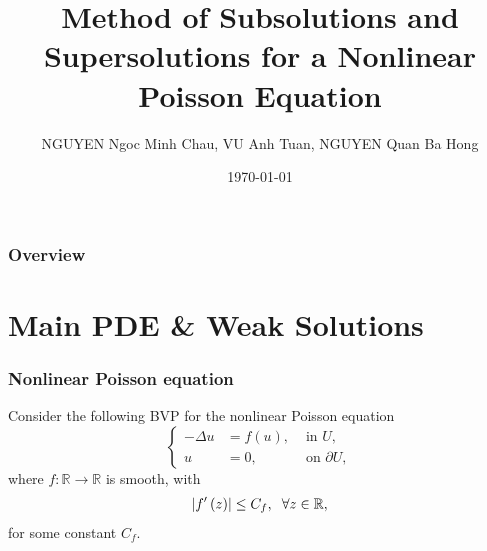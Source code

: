 \documentclass{beamer}
\title[Methods of Subsolutions and Supersolutions for a Nonlinear Poisson Equation]{Method of Subsolutions and Supersolutions for a Nonlinear Poisson Equation} %
\author{\small NGUYEN Ngoc Minh Chau, VU Anh Tuan, NGUYEN Quan Ba Hong} %
\institute[Universit\'e de Rennes 1] %
{
Universit\'e de Rennes 1, France \\ %
}
\date{\today} %
\begin{document}
\begin{frame}
\titlepage %


\end{frame}

\begin{frame}
\frametitle{Overview} %
\tableofcontents %
\end{frame}


\section{Main PDE \& Weak Solutions} %

\begin{frame}
\frametitle{Nonlinear Poisson equation}
Consider the following BVP for the nonlinear Poisson equation
\begin{equation}
\label{1.1}
\left\{ \begin{split}
 - \Delta u &= f\left( u \right), & \mbox{ in } U,\\
u &= 0, & \mbox{ on } \partial U,
\end{split} \right.
\end{equation}
where $f:\mathbb{R}\to \mathbb{R}$ is smooth, with 
\begin{align}
\label{1.2}
\left| {f'\left( z \right)} \right| \le C_f, \hspace{2mm}\forall z \in \mathbb{R},
\end{align}
for some constant $C_f$.

\end{frame}
\end{document}
